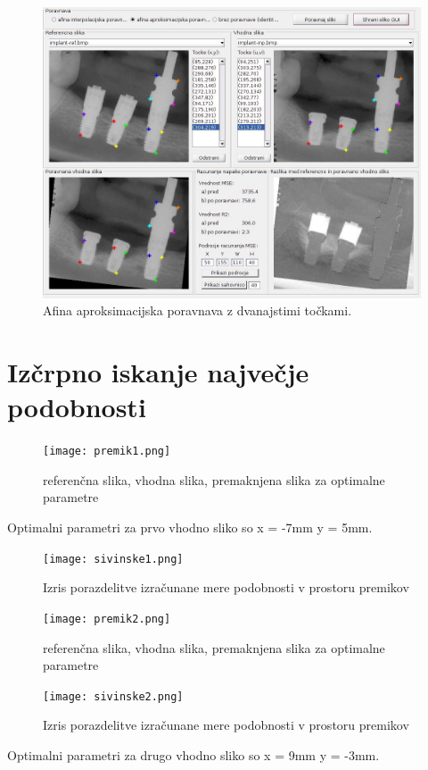 \documentclass[12pt,a4paper]{article}
\begin{document}
\begin{figure}[h!]
  \begin{center}
    \includegraphics[scale = 0.35]{GUI3.jpg}
    \caption{Afina aproksimacijska poravnava z dvanajstimi točkami. }
    \label{fig:}
  \end{center}
\end{figure}
\section{Izčrpno iskanje največje podobnosti}
\begin{figure}[h!]
  \begin{center}
    \texttt{[image: premik1.png]}
    \caption{referenčna slika, vhodna slika, premaknjena slika za optimalne parametre}
    \label{fig:}
  \end{center}
\end{figure}
Optimalni parametri za prvo vhodno sliko so x = -7mm y = 5mm. \\
\begin{figure}[h!]
  \begin{center}
    \texttt{[image: sivinske1.png]}
    \caption{Izris porazdelitve izračunane mere podobnosti v prostoru premikov}
    \label{fig:}
  \end{center}
\end{figure}
\pagebreak
\begin{figure}[h!]
  \begin{center}
    \texttt{[image: premik2.png]}
    \caption{referenčna slika, vhodna slika, premaknjena slika za optimalne parametre}
    \label{fig:}
  \end{center}
\end{figure} 
\begin{figure}[h!]
  \begin{center}
    \texttt{[image: sivinske2.png]}
    \caption{Izris porazdelitve izračunane mere podobnosti v prostoru premikov}
    \label{fig:}
  \end{center}
\end{figure}

Optimalni parametri za drugo vhodno sliko so x = 9mm y = -3mm.
\end{document}
